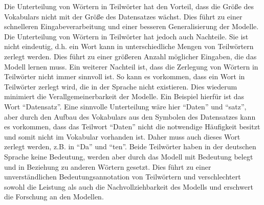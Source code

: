 Die Unterteilung von Wörtern in Teilwörter hat den Vorteil, dass die Größe des Vokabulars nicht mit der Größe des Datensatzes wächst.
Dies führt zu einer schnelleren Eingabeverarbeitung und einer besseren Generalisierung der Modelle.
Die Unterteilung von Wörtern in Teilwörter hat jedoch auch Nachteile.
Sie ist nicht eindeutig, d.h.
ein Wort kann in unterschiedliche Mengen von Teilwörtern zerlegt werden.
Dies führt zu einer größeren Anzahl möglicher Eingaben, die das Modell lernen muss.
Ein weiterer Nachteil ist, dass die Zerlegung von Wörtern in Teilwörter nicht immer sinnvoll ist.
So kann es vorkommen, dass ein Wort in Teilwörter zerlegt wird, die in der Sprache nicht existieren.
Dies wiederum minimiert die Verallgemeinerbarkeit der Modelle.
Ein Beispiel hierfür ist das Wort \enquote{Datensatz}.
Eine sinnvolle Unterteilung wäre hier \enquote{Daten} und \enquote{satz}, aber durch den Aufbau des Vokabulars aus den Symbolen des Datensatzes kann es vorkommen, dass das Teilwort \enquote{Daten} nicht die notwendige Häufigkeit besitzt und somit nicht im Vokabular vorhanden ist.
Daher muss auch dieses Wort zerlegt werden, z.B.
in \enquote{Da} und \enquote{ten}.
Beide Teilwörter haben in der deutschen Sprache keine Bedeutung, werden aber durch das Modell mit Bedeutung belegt und in Beziehung zu anderen Wörtern gesetzt.
Dies führt zu einer unverständlichen Bedeutungsannotation von Teilwörtern und verschlechtert sowohl die Leistung als auch die Nachvollziehbarkeit des Modells und erschwert die Forschung an den Modellen.


